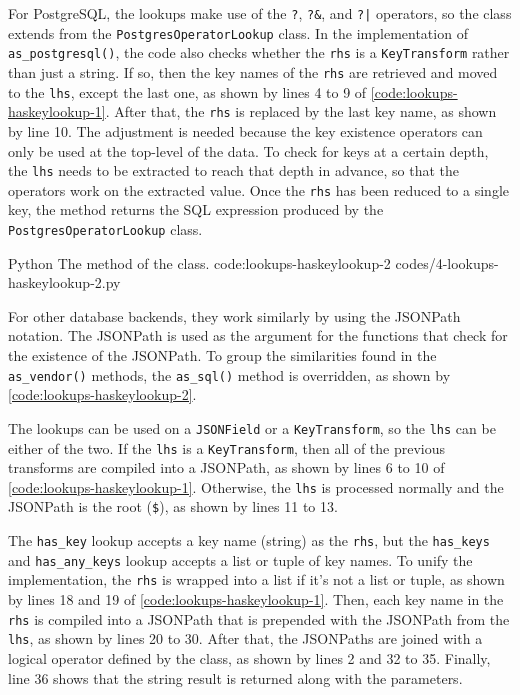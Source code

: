 For PostgreSQL, the lookups make use of the \verb|?|, \verb|?&|, and \verb=?|=
operators, so the class extends from the \verb|PostgresOperatorLookup| class.
In the implementation of \verb|as_postgresql()|, the code also checks whether
the \verb|rhs| is a \verb|KeyTransform| rather than just a string. If so, then
the key names of the \verb|rhs| are retrieved and moved to the \verb|lhs|,
except the last one, as shown by lines 4 to 9 of
\autoref{code:lookups-haskeylookup-1}. After that, the \verb|rhs| is replaced
by the last key name, as shown by line 10. The adjustment is needed because
the key existence operators can only be used at the top-level of the data. To
check for keys at a certain depth, the \verb|lhs| needs to be extracted to
reach that depth in advance, so that the operators work on the extracted value.
Once the \verb|rhs| has been reduced to a single key, the method returns the
SQL expression produced by the \verb|PostgresOperatorLookup| class.

\listing
{Python}
{The  method of the  class.}
{code:lookups-haskeylookup-2}
{codes/4-lookups-haskeylookup-2.py}

For other database backends, they work similarly by using the JSONPath
notation. The JSONPath is used as the argument for the functions that check for
the existence of the JSONPath. To group the similarities found in the
\verb|as_vendor()| methods, the \verb|as_sql()| method is overridden, as shown
by \autoref{code:lookups-haskeylookup-2}.

The lookups can be used on a \verb|JSONField| or a \verb|KeyTransform|, so the
\verb|lhs| can be either of the two. If the \verb|lhs| is a
\verb|KeyTransform|, then all of the previous transforms are compiled into a
JSONPath, as shown by lines 6 to 10 of \autoref{code:lookups-haskeylookup-1}.
Otherwise, the \verb|lhs| is processed normally and the JSONPath is the root
(\verb|$|), as shown by lines 11 to 13.

The \verb|has_key| lookup accepts a key name (string) as the \verb|rhs|, but
the \verb|has_keys| and \verb|has_any_keys| lookup accepts a list or tuple of
key names. To unify the implementation, the \verb|rhs| is wrapped into a list
if it's not a list or tuple, as shown by lines 18 and 19 of
\autoref{code:lookups-haskeylookup-1}. Then, each key name in the \verb|rhs| is
compiled into a JSONPath that is prepended with the JSONPath from the
\verb|lhs|, as shown by lines 20 to 30. After that, the JSONPaths are joined
with a logical operator defined by the class, as shown by lines 2 and 32 to 35.
Finally, line 36 shows that the string result is returned along with the
parameters.


